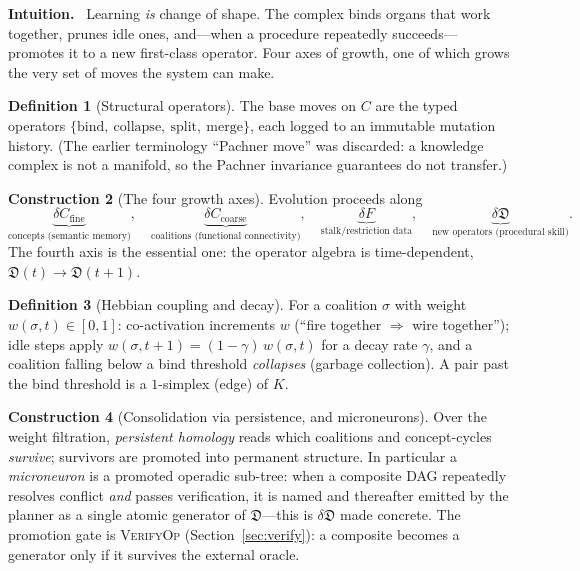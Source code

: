 \documentclass[11pt]{article}
\theoremstyle{definition}
\newtheorem{definition}{Definition}[section]
\newtheorem{construction}[definition]{Construction}
\theoremstyle{plain}
\theoremstyle{remark}
\newcommand{\Intu}{\noindent\textbf{\color{intuitioncol}Intuition.}\ }
\newcommand{\CC}{C}                 %
\newcommand{\Kc}{K}                 %
\newcommand{\Fs}{F}                 %
\newcommand{\Dop}{\mathfrak{D}}     %
\begin{document}
\begin{intu}\Intu
Learning \emph{is} change of shape. The complex binds organs that work together,
prunes idle ones, and---when a procedure repeatedly succeeds---promotes it to a new
first-class operator. Four axes of growth, one of which grows the very set of moves the
system can make.
\end{intu}

\begin{definition}[Structural operators]
The base moves on $\CC$ are the typed operators
$\{\text{bind},\ \text{collapse},\ \text{split},\ \text{merge}\}$, each logged to an
immutable mutation history. (The earlier terminology ``Pachner move'' was discarded: a
knowledge complex is not a manifold, so the Pachner invariance guarantees do not
transfer.)
\end{definition}

\begin{construction}[The four growth axes]\label{con:axes}
Evolution proceeds along
\[
\underbrace{\delta \CC_{\text{fine}}}_{\text{concepts (semantic memory)}}\!,\quad
\underbrace{\delta \CC_{\text{coarse}}}_{\text{coalitions (functional connectivity)}}\!,\quad
\underbrace{\delta \Fs}_{\text{stalk/restriction data}}\!,\quad
\underbrace{\delta \Dop}_{\text{new operators (procedural skill)}} .
\]
The fourth axis is the essential one: the operator algebra is time-dependent,
$\Dop(t)\to\Dop(t+1)$.
\end{construction}

\begin{definition}[Hebbian coupling and decay]\label{def:hebb-decay}
For a coalition $\sigma$ with weight $w(\sigma,t)\in[0,1]$: co-activation increments
$w$ (``fire together $\Rightarrow$ wire together''); idle steps apply
$w(\sigma,t{+}1)=(1-\gamma)\,w(\sigma,t)$ for a decay rate $\gamma$, and a coalition
falling below a bind threshold \emph{collapses} (garbage collection). A pair past the
bind threshold is a $1$-simplex (edge) of $\Kc$.
\end{definition}

\begin{construction}[Consolidation via persistence, and microneurons]\label{con:micro}
Over the weight filtration, \emph{persistent homology} reads which coalitions and
concept-cycles \emph{survive}; survivors are promoted into permanent structure. In
particular a \emph{microneuron} is a promoted operadic sub-tree: when a composite DAG
repeatedly resolves conflict \emph{and} passes verification, it is named and
thereafter emitted by the planner as a single atomic generator of $\Dop$---this is
$\delta\Dop$ made concrete. The promotion gate is \textsc{VerifyOp}
(Section~\ref{sec:verify}): a composite becomes a generator only if it survives the
external oracle.
\end{construction}
\end{document}
